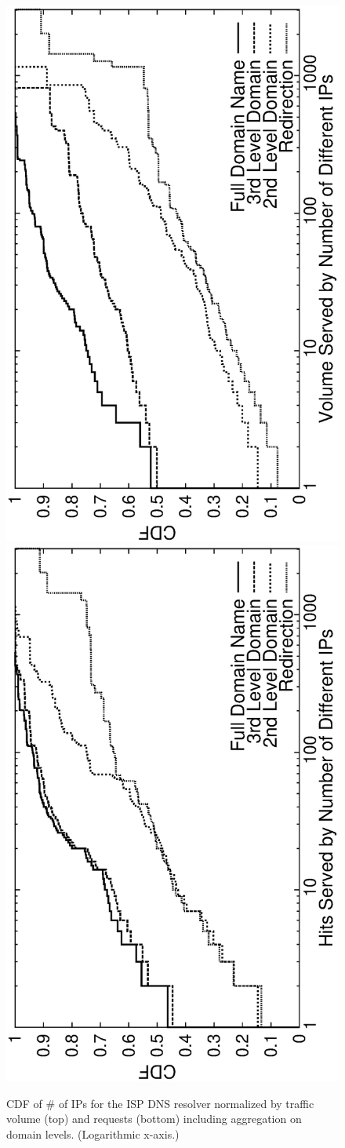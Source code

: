 \begin{figure}[tbp]
  \center
   \includegraphics[height=0.7\linewidth,angle=-90]{figures/14day-returnedIPCDF-bytes.ps}
   \includegraphics[height=0.7\linewidth,angle=-90]{figures/14day-returnedIPCDF-hits.ps}
  \caption{CDF of \# of IPs for the ISP DNS resolver normalized by traffic
    volume  (top) and requests (bottom) including aggregation on
    domain levels. (Logarithmic x-axis.)}
  \label{fig:CDF-IPPAF-IPs}
\end{figure}

